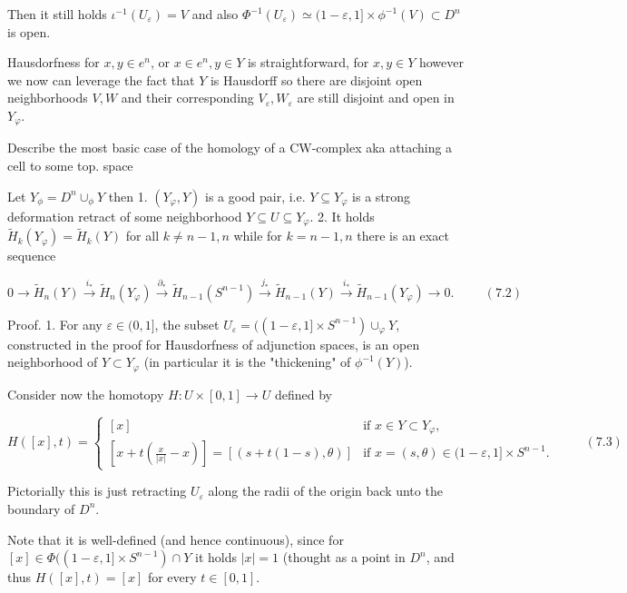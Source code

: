 Then it still holds \( \iota^{-1}(U_{\varepsilon}) = V \) and also \( \Phi^{-1}(U_{\varepsilon}) \simeq (1 - \varepsilon, 1] \times \phi^{-1}(V) \subset D^n \)
is open.

Hausdorfness for \( x, y \in e^n \), or \( x \in e^n, y \in Y \) is straightforward, for \( x, y \in Y \) however we now can leverage the fact that \( Y \)
is Hausdorff so there are disjoint open neighborhoods \( V, W \) and their corresponding \( V_\varepsilon, W_\varepsilon \) are still disjoint and open in \( Y_\varphi \).


Describe the most basic case of the homology of a CW-complex aka attaching a cell to some top. space

Let \( Y_\phi = D^n \cup_\phi Y \) then
1. \( (Y_\varphi, Y) \) is a good pair, i.e. \( Y \subseteq Y_\varphi \) is a strong deformation retract of some neighborhood \( Y \subseteq U \subseteq Y_\varphi \).
2. It holds \( \tilde{H}_k(Y_\varphi) = \tilde{H}_k(Y) \) for all \( k \neq n-1, n \) while for \( k = n-1, n \) there is an exact sequence

\[0 \rightarrow \tilde{H}_n(Y) \xrightarrow{i_*} \tilde{H}_n(Y_{\varphi}) \xrightarrow{\partial_*} \tilde{H}_{n-1}(S^{n-1}) \xrightarrow{j_*} \tilde{H}_{n-1}(Y) \xrightarrow{i_*} \tilde{H}_{n-1}(Y_{\varphi}) \rightarrow 0. \hspace{1cm} (7.2)\]

Proof. 1. For any \(\varepsilon \in (0,1]\), the subset \(U_\varepsilon = ((1-\varepsilon, 1] \times S^{n-1}) \cup_{\varphi} Y\), constructed 
in the proof for Hausdorfness of adjunction spaces, is an open neighborhood of \(Y \subset Y_{\varphi}\) (in particular it is the "thickening" of \( \phi^{-1}(Y) \)).

Consider now the homotopy \(H: U \times [0,1] \rightarrow U\) defined by

\[
H([x],t) = \begin{cases}
[x] & \text{if } x \in Y \subset Y_{\varphi}, \\
[x + t(\frac{x}{|x|} - x)] = [(s + t(1-s), \theta)] & \text{if } x = (s, \theta) \in (1-\varepsilon, 1] \times S^{n-1}.
\end{cases} \hspace{1cm} (7.3)
\]

Pictorially this is just retracting \( U_\varepsilon \) along the radii of the origin back unto the boundary of \( D^n \).

Note that it is well-defined (and hence continuous), since for \([x] \in \Phi((1-\varepsilon, 1] \times S^{n-1}) \cap Y\) 
it holds \(|x| = 1\) (thought as a point in \(D^n\), and thus \( H([x], t) = [x] \) for every \( t \in [0, 1] \).

